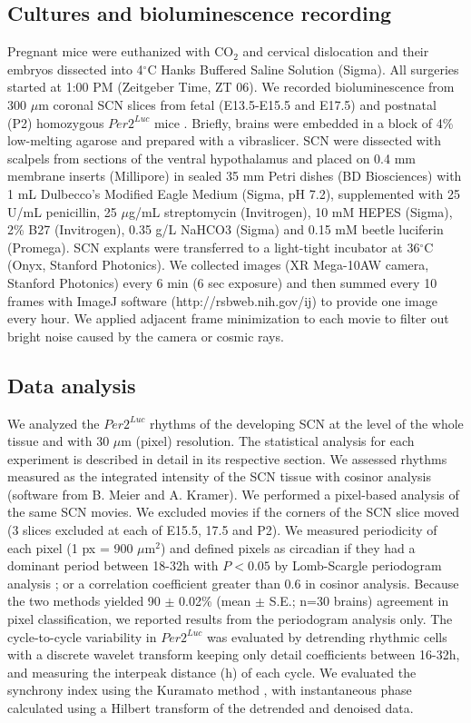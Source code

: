 \subsection*{Cultures and bioluminescence recording}
Pregnant mice were euthanized with CO$_2$ and cervical dislocation and their embryos dissected into 4$^\circ$C Hanks Buffered Saline Solution (Sigma).
All surgeries started at 1:00 PM (Zeitgeber Time, ZT 06).
We recorded bioluminescence from 300 $\mu$m coronal SCN slices from fetal (E13.5-E15.5 and E17.5) and postnatal (P2) homozygous $Per2^{Luc}$ mice \cite{Landgraf2015}.
Briefly, brains were embedded in a block of 4\% low-melting agarose and prepared with a vibraslicer.
SCN were dissected with scalpels from sections of the ventral hypothalamus and placed on 0.4 mm membrane inserts (Millipore) in sealed 35 mm Petri dishes (BD Biosciences) with 1 mL Dulbecco's Modified Eagle Medium (Sigma, pH 7.2), supplemented with 25 U/mL penicillin, 25 $\mu$g/mL streptomycin (Invitrogen), 10 mM HEPES (Sigma), 2\% B27 (Invitrogen), 0.35 g/L NaHCO3 (Sigma) and 0.15 mM beetle luciferin (Promega).
SCN explants were transferred to a light-tight incubator at 36$^\circ$C (Onyx, Stanford Photonics).
We collected images (XR Mega-10AW camera, Stanford Photonics) every 6 min (6 sec exposure) and then summed every 10 frames with ImageJ software (http://rsbweb.nih.gov/ij) to provide one image every hour.
We applied adjacent frame minimization to each movie to filter out bright noise caused by the camera or cosmic rays.

\subsection*{Data analysis}
We analyzed the $Per2^{Luc}$ rhythms of the developing SCN at the level of the whole tissue and with 30 $\mu$m (pixel) resolution.
The statistical analysis for each experiment is described in detail in its respective section.
We assessed rhythms measured as the integrated intensity of the SCN tissue with cosinor analysis (software from B. Meier and A. Kramer).
We performed a pixel-based analysis of the same SCN movies.
We excluded movies if the corners of the SCN slice moved (3 slices excluded at each of E15.5, 17.5 and P2).
We measured periodicity of each pixel (1 px = 900 $\mu$m$^2$) and defined pixels as circadian if they had a dominant period between 18-32h with $P < 0.05$ by Lomb-Scargle periodogram analysis \cite{Ruf1999}; or a correlation coefficient greater than 0.6 in cosinor analysis.
Because the two methods yielded 90 $\pm$ 0.02\% (mean $\pm$ S.E.; n=30 brains) agreement in pixel classification, we reported results from the periodogram analysis only.
The cycle-to-cycle variability in $Per2^{Luc}$ was evaluated by detrending rhythmic cells with a discrete wavelet transform \cite{Leise2011} keeping only detail coefficients between 16-32h, and measuring the interpeak distance (h) of each cycle.
We evaluated the synchrony index using the Kuramato method \cite{kuramoto1984}, with instantaneous phase calculated using a Hilbert transform of the detrended and denoised data.

